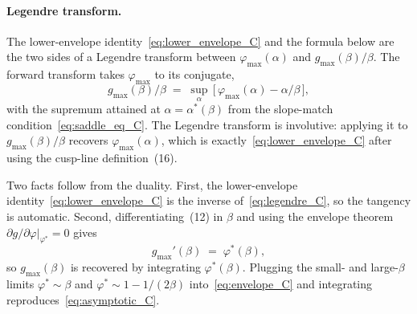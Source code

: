 \documentclass[letterpaper]{article} %
\newcommand{\Bnet}{\beta}
\newcommand{\p}{\partial}
\begin{document}
\paragraph{Legendre transform.}
The lower-envelope identity~\eqref{eq:lower_envelope_C} and the formula
below are the two sides of a Legendre transform between
$\varphi_{\max}(\alpha)$ and $g_{\max}(\Bnet)/\Bnet$.  The forward
transform takes $\varphi_{\max}$ to its conjugate,
\begin{equation}
g_{\max}(\Bnet)/\Bnet \;=\; \sup_\alpha\,\bigl[\,\varphi_{\max}(\alpha) - \alpha/\Bnet\,\bigr],
\tag{52}
\label{eq:legendre_C}
\end{equation}
with the supremum attained at $\alpha = \alpha^*(\Bnet)$ from the
slope-match condition~\eqref{eq:saddle_eq_C}.  The Legendre transform
is involutive: applying it to $g_{\max}(\Bnet)/\Bnet$ recovers
$\varphi_{\max}(\alpha)$, which is exactly~\eqref{eq:lower_envelope_C}
after using the cusp-line definition~(16).

Two facts follow from the duality.  First, the lower-envelope
identity~\eqref{eq:lower_envelope_C} is the inverse
of~\eqref{eq:legendre_C}, so the tangency is automatic.  Second,
differentiating~(12) in $\Bnet$ and using the
envelope theorem $\p g/\p\varphi|_{\varphi^*} = 0$ gives
\begin{equation}
g_{\max}'(\Bnet) \;=\; \varphi^*(\Bnet),
\tag{53}
\label{eq:envelope_C}
\end{equation}
so $g_{\max}(\Bnet)$ is recovered by integrating $\varphi^*(\Bnet)$.
Plugging the small- and large-$\Bnet$ limits $\varphi^* \sim \Bnet$
and $\varphi^* \sim 1 - 1/(2\Bnet)$ into~\eqref{eq:envelope_C} and
integrating reproduces~\eqref{eq:asymptotic_C}.


\end{document}
